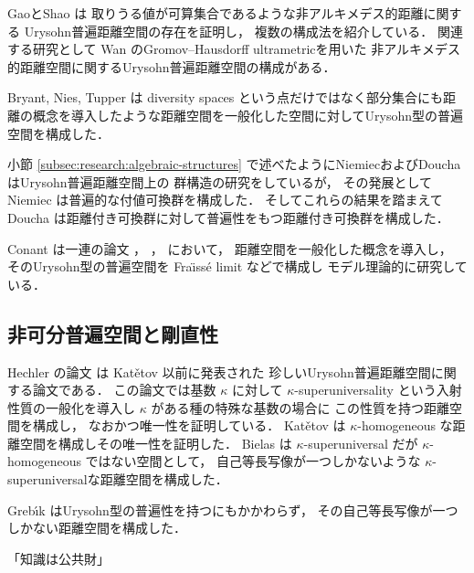 \documentclass[leqno, 12pt]{jsarticle}
\begin{document}
GaoとShao
\cite{GS}
は
取りうる値が可算集合であるような非アルキメデス的距離に関する
Urysohn普遍距離空間の存在を証明し，%
複数の構成法を紹介している．
関連する研究として
Wan
\cite{Wan}
のGromov--Hausdorff ultrametricを用いた
非アルキメデス的距離空間に関するUrysohn普遍距離空間の構成がある．



Bryant, Nies, Tupper
\cite{BNT}
は diversity spaces という点だけではなく部分集合にも距離の概念を導入したような距離空間を一般化した空間に対してUrysohn型の普遍空間を構成した．



小節
\ref{subsec:research:algebraic-structures}
で述べたようにNiemiecおよびDouchaはUrysohn普遍距離空間上の
群構造の研究をしているが，%
その発展として
Niemiec
 \cite{Nie2013}
は普遍的な付値可換群を構成した．
そしてこれらの結果を踏まえて
Doucha
\cite{Doucha17}
は距離付き可換群に対して普遍性をもつ距離付き可換群を構成した．


Conant
は一連の論文
\cite{conantthesis}，
\cite{conant}，
\cite{conant2}
において，
距離空間を一般化した概念を導入し，
そのUrysohn型の普遍空間を
Fra\"{\i}ss\'e limit
などで構成し
モデル理論的に研究している．



\subsection{非可分普遍空間と剛直性}\label{subsec:research:nonseparable-rigidity}

Hechler
の論文
\cite{Hechler}
は
Kat\v{e}tov
\cite{Ka}
以前に発表された
珍しいUrysohn普遍距離空間に関する論文である．
この論文では基数
$\kappa$
に対して
$\kappa$-superuniversality
という入射性質の一般化を導入し
$\kappa$%
がある種の特殊な基数の場合に
この性質を持つ距離空間を構成し，
なおかつ唯一性を証明している．
Kat\v{e}tov
\cite{Ka}は
$\kappa$-homogeneous
な距離空間を構成しその唯一性を証明した．
Bielas \cite{Bielas}
は
$\kappa$-superuniversal
だが
$\kappa$-homogeneous
ではない空間として，
自己等長写像が一つしかないような
$\kappa$-superuniversalな距離空間を構成した．


Greb\'{\i}k \cite{Gre}
はUrysohn型の普遍性を持つにもかかわらず，
その自己等長写像が一つしかない距離空間を構成した．




\newpage

\begingroup
\setlength{\emergencystretch}{3em}
\sloppy
{}
\nocite{*}

\endgroup


\medskip
\begin{center}
「知識は公共財」
\end{center}
			
\end{document}
